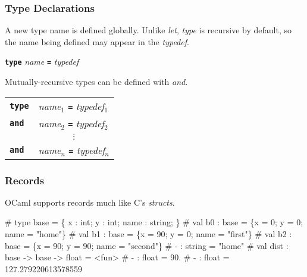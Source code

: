 \documentclass{plt}
\begin{document}
\begin{frame}[fragile]
  \frametitle{Type Declarations}

A new type name is defined globally.  Unlike \emph{let}, \emph{type}
is recursive by default, so the name being defined may appear in the
\emph{typedef}.

  \begin{center}
    \textbf{\texttt{type}} \emph{name} \textbf{\texttt{=}} \emph{typedef}
  \end{center}

Mutually-recursive types can be defined with \emph{and}.

\begin{center}
\begin{tabular}{l@{\;}l}
\textbf{\texttt{type}} & \emph{name}$_1$ \textbf{\texttt{=}}
\emph{typedef}$_1$ \\
\textbf{\texttt{and}} & \emph{name}$_2$ \textbf{\texttt{=}}
\emph{typedef}$_2$ \\
& \multicolumn{1}{c}{$\vdots$} \\
\textbf{\texttt{and}} & \emph{name}$_n$ \textbf{\texttt{=}}
\emph{typedef}$_n$ \\
\end{tabular}
\end{center}

\end{frame}

\begin{frame}[fragile]
  \frametitle{Records}

OCaml supports records much like C's \emph{structs}.

\begin{interactive}
# 
type base = \{ x : int; y : int; name : string; \}
# 
val b0 : base = \{x = 0; y = 0; name = "home"\}
# 
val b1 : base = \{x = 90; y = 0; name = "first"\}
# 
val b2 : base = \{x = 90; y = 90; name = "second"\}
# 
- : string = "home"
# 
val dist : base -> base -> float = <fun>
# 
- : float = 90.
# 
- : float = 127.279220613578559
\end{interactive}

\end{frame}
\end{document}
